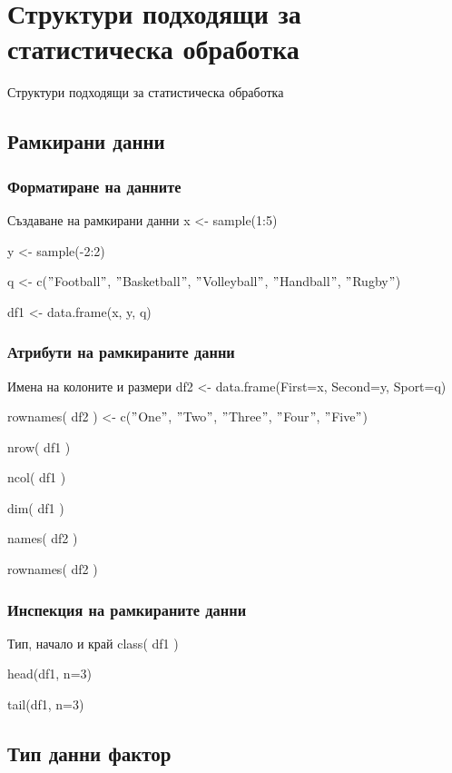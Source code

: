 \documentclass{beamer}
\begin{document}
\section{Структури подходящи за статистическа обработка}

\begin{frame}
\center \huge{Структури подходящи за статистическа обработка}
\end{frame}

\subsection{Рамкирани данни}

\begin{frame}
\frametitle{Форматиране на данните}
\begin{block}{Създаване на рамкирани данни}
x <- sample(1:5)

y <- sample(-2:2)

q <- c($"$Football$"$, $"$Basketball$"$, $"$Volleyball$"$, $"$Handball$"$, $"$Rugby$"$)

df1 <- data.frame(x, y, q)
\end{block}
\end{frame}

\begin{frame}
\frametitle{Атрибути на рамкираните данни}
\begin{block}{Имена на колоните и размери}
df2 <- data.frame(First=x, Second=y, Sport=q)

rownames( df2 ) <- c($"$One$"$, $"$Two$"$, $"$Three$"$, $"$Four$"$, $"$Five$"$)

nrow( df1 )

ncol( df1 )

dim( df1 )

names( df2 )

rownames( df2 )
\end{block}
\end{frame}

\begin{frame}
\frametitle{Инспекция на рамкираните данни}
\begin{block}{Тип, начало и край}
class( df1 )

head(df1, n=3)

tail(df1, n=3)
\end{block}
\end{frame}

\subsection{Тип данни фактор}
\end{document}
